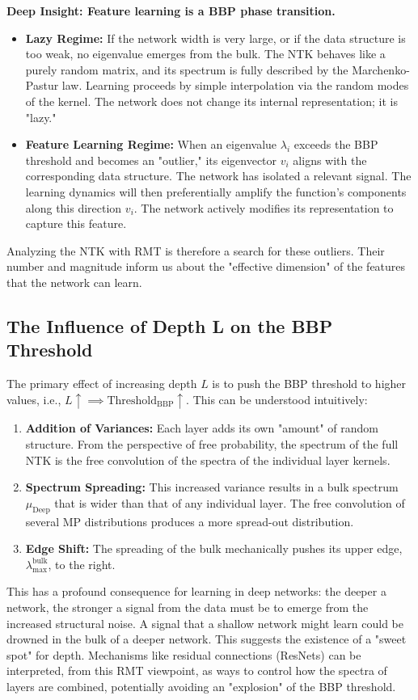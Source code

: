 \documentclass[a4paper]{article}
\begin{document}
\textbf{Deep Insight: Feature learning is a BBP phase transition.}
\begin{itemize}
    \item \textbf{Lazy Regime:} If the network width is very large, or if the data structure is too weak, no eigenvalue emerges from the bulk. The NTK behaves like a purely random matrix, and its spectrum is fully described by the Marchenko-Pastur law. Learning proceeds by simple interpolation via the random modes of the kernel. The network does not change its internal representation; it is "lazy."
    \item \textbf{Feature Learning Regime:} When an eigenvalue $\lambda_i$ exceeds the BBP threshold and becomes an "outlier," its eigenvector $v_i$ aligns with the corresponding data structure. The network has isolated a relevant signal. The learning dynamics will then preferentially amplify the function's components along this direction $v_i$. The network actively modifies its representation to capture this feature.
\end{itemize}
Analyzing the NTK with RMT is therefore a search for these outliers. Their number and magnitude inform us about the "effective dimension" of the features that the network can learn.

\subsection{The Influence of Depth L on the BBP Threshold}
The primary effect of increasing depth $L$ is to push the BBP threshold to higher values, i.e., $L \uparrow \implies \text{Threshold}_{\text{BBP}} \uparrow$. This can be understood intuitively:
\begin{enumerate}
    \item \textbf{Addition of Variances:} Each layer adds its own "amount" of random structure. From the perspective of free probability, the spectrum of the full NTK is the free convolution of the spectra of the individual layer kernels.
    \item \textbf{Spectrum Spreading:} This increased variance results in a bulk spectrum $\mu_{\text{Deep}}$ that is wider than that of any individual layer. The free convolution of several MP distributions produces a more spread-out distribution.
    \item \textbf{Edge Shift:} The spreading of the bulk mechanically pushes its upper edge, $\lambda_{\max}^{\text{bulk}}$, to the right.
\end{enumerate}
This has a profound consequence for learning in deep networks: the deeper a network, the stronger a signal from the data must be to emerge from the increased structural noise. A signal that a shallow network might learn could be drowned in the bulk of a deeper network. This suggests the existence of a "sweet spot" for depth. Mechanisms like residual connections (ResNets) can be interpreted, from this RMT viewpoint, as ways to control how the spectra of layers are combined, potentially avoiding an "explosion" of the BBP threshold.
\end{document}

